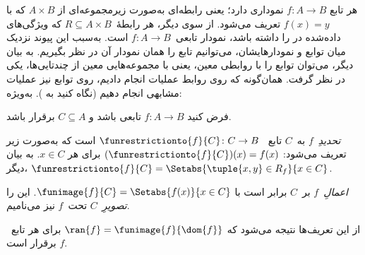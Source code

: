 \documentclass[../../../include/open-logic-section]{subfiles}
\begin{document}
\begin{explain}
هر تابع $f\colon A \to B$ نموداری دارد؛ یعنی رابطه‌ای به‌صورت زیرمجموعه‌ای از $A
\times B$ که با $f(x) = y$ تعریف می‌شود. از سوی دیگر، هر رابطهٔ~$R
\subseteq A \times B$ که ویژگی‌های داده‌شده در
 را داشته باشد، نمودار تابعی~$f \colon A \to
B$ است. به‌سبب این پیوند نزدیک میان توابع و
نمودارهایشان، می‌توانیم تابع را همان نمودار آن در نظر بگیریم. به
بیان دیگر، می‌توان توابع را با روابطی معین، یعنی با
مجموعه‌هایی معین از چندتایی‌ها، یکی در نظر گرفت.  همان‌گونه که روی روابط عملیات انجام دادیم،
روی توابع نیز عملیات مشابهی انجام دهیم (نگاه کنید به
). به‌ویژه:
\end{explain}

\begin{defn}
فرض کنید $f \colon A \to B$ تابعی باشد و $C\subseteq A$ برقرار باشد.

\emph{تحدیدِ}~$f$ به~$C$ تابع
~$\funrestrictionto{f}{C}\colon C \to B$ است که به‌صورت زیر تعریف می‌شود:
$(\funrestrictionto{f}{C})(x) = f(x)$ برای هر $x \in C$. به
بیان دیگر، $\funrestrictionto{f}{C} = \Setabs{\tuple{x, y} \in R_f}{x \in
C}$.

\emph{اعمالِ}~$f$ بر~$C$ برابر است با $\funimage{f}{C} =
\Setabs{f(x)}{x \in C}$. این را \emph{تصویرِ}~$C$
تحت~$f$ نیز می‌نامیم.
\end{defn}

\begin{explain}
از این تعریف‌ها نتیجه می‌شود که $\ran{f} =
\funimage{f}{\dom{f}}$ برای هر تابع~$f$ برقرار است.
\end{explain}
\end{document}

